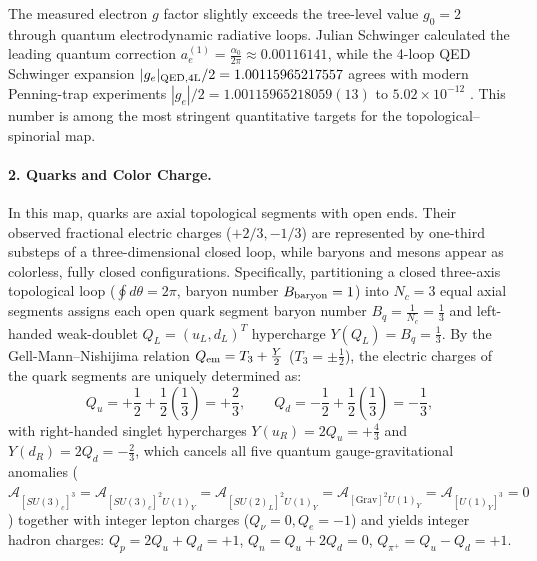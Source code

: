 \documentclass[11pt,a4paper]{article}
\begin{document}
The measured electron $g$ factor slightly exceeds the tree-level value $g_0 = 2$ through quantum electrodynamic radiative loops. Julian Schwinger calculated the leading quantum correction $a_e^{(1)} = \frac{\alpha_0}{2\pi} \approx 0.00116141$, while the 4-loop QED Schwinger expansion $|g_e|_{\rm QED,4L}/2 = 1.00115965217557$ agrees with modern Penning-trap experiments $|g_e|/2=1.00115965218059(13)$ to $5.02\times 10^{-12}$ \citep{schwinger1948,fan2023}. This number is among the most stringent quantitative targets for the topological--spinorial map.

\paragraph{2. Quarks and Color Charge.} In this map, quarks are axial topological segments with open ends. Their observed fractional electric charges ($+2/3,-1/3$) are represented by one-third substeps of a three-dimensional closed loop, while baryons and mesons appear as colorless, fully closed configurations. Specifically, partitioning a closed three-axis topological loop ($\oint d\theta = 2\pi$, baryon number $B_{\rm baryon} = 1$) into $N_c = 3$ equal axial segments assigns each open quark segment baryon number $B_q = \frac{1}{N_c} = \frac{1}{3}$ and left-handed weak-doublet $Q_L = (u_L, d_L)^T$ hypercharge $Y(Q_L) = B_q = \frac{1}{3}$. By the Gell-Mann--Nishijima relation $Q_{\rm em} = T_3 + \frac{Y}{2}$ ($T_3 = \pm\frac{1}{2}$), the electric charges of the quark segments are uniquely determined as:
\begin{equation}
Q_u = +\frac{1}{2} + \frac{1}{2}\left(\frac{1}{3}\right) = +\frac{2}{3}, \qquad Q_d = -\frac{1}{2} + \frac{1}{2}\left(\frac{1}{3}\right) = -\frac{1}{3},
\end{equation}
with right-handed singlet hypercharges $Y(u_R) = 2 Q_u = +\frac{4}{3}$ and $Y(d_R) = 2 Q_d = -\frac{2}{3}$, which cancels all five quantum gauge-gravitational anomalies ($\mathcal{A}_{[SU(3)_c]^3} = \mathcal{A}_{[SU(3)_c]^2 U(1)_Y} = \mathcal{A}_{[SU(2)_L]^2 U(1)_Y} = \mathcal{A}_{[\mathrm{Grav}]^2 U(1)_Y} = \mathcal{A}_{[U(1)_Y]^3} = 0$) together with integer lepton charges ($Q_\nu = 0, Q_e = -1$) and yields integer hadron charges: $Q_p = 2 Q_u + Q_d = +1$, $Q_n = Q_u + 2 Q_d = 0$, $Q_{\pi^+} = Q_u - Q_d = +1$.
\end{document}
